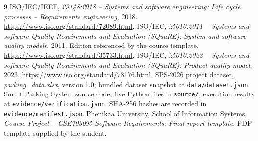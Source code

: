 \documentclass[12pt,a4paper,oneside]{report}
\renewcommand{\chaptername}{Chapter}
\begin{document}









\clearpage{}
\begin{thebibliography}{9}
 ISO/IEC/IEEE, \emph{29148:2018 -- Systems and software engineering: Life cycle processes -- Requirements engineering}, 2018. \url{https://www.iso.org/standard/72089.html}.
 ISO/IEC, \emph{25010:2011 -- Systems and software Quality Requirements and Evaluation (SQuaRE): System and software quality models}, 2011. Edition referenced by the course template. \url{https://www.iso.org/standard/35733.html}.
 ISO/IEC, \emph{25010:2023 -- Systems and software Quality Requirements and Evaluation (SQuaRE): Product quality model}, 2023. \url{https://www.iso.org/standard/78176.html}.
 SPS-2026 project dataset, \emph{parking\_data.xlsx}, version 1.0; bundled dataset snapshot at \texttt{data/dataset.json}.
 Smart Parking System source code, five Python files in \texttt{source/}; execution results at \texttt{evidence/verification.json}. SHA-256 hashes are recorded in \texttt{evidence/manifest.json}.
 Phenikaa University, School of Information Systems, \emph{Course Project -- CSE703095 Software Requirements: Final report template}, PDF template supplied by the student.
\end{thebibliography}
\appendix
\renewcommand{\chaptername}{Appendix}


\end{document}
